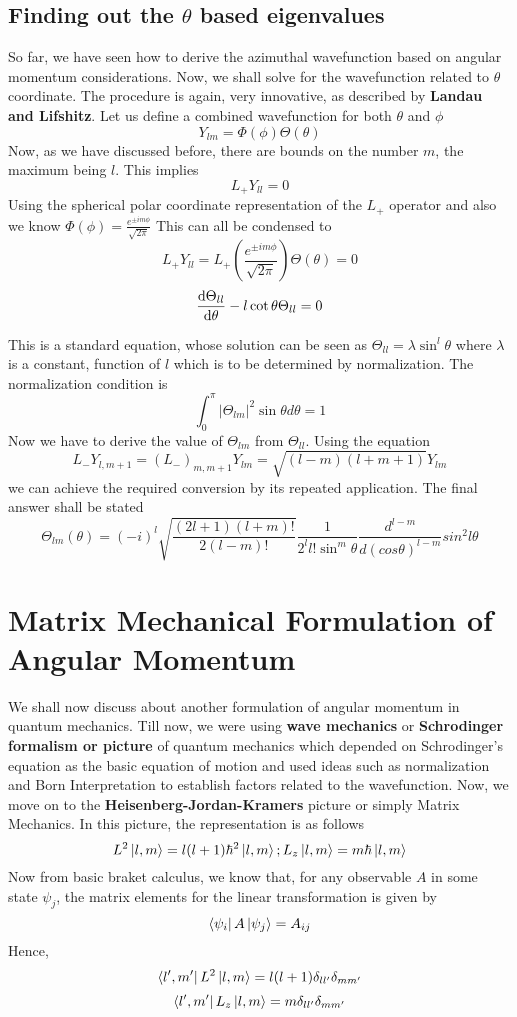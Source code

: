 \documentclass[12pt]{article}
\begin{document}
\subsection{Finding out the $\theta$ based eigenvalues}
So far, we have seen how to derive the azimuthal wavefunction based on angular momentum considerations. Now, we shall solve for the wavefunction related to $\theta$ coordinate. The procedure is again, very innovative, as described by \textbf{Landau and Lifshitz}. Let us define a combined wavefunction for both $\theta$ and $\phi$ $$Y_{lm} = \Phi(\phi)\Theta(\theta)$$ Now, as we have discussed before, there are bounds on the number $m$, the maximum being $l$. This implies $$L_+Y_{ll} = 0$$ Using the spherical polar coordinate representation of the $L_+$ operator and also we know $\Phi(\phi) = \frac{e^{\pm im\phi}}{\sqrt {2\pi}}$ This can all be condensed to 
$$L_+Y_{ll} = L_+(\frac{e^{\pm im\phi}}{\sqrt {2\pi}})\Theta(\theta) = 0$$
$$\frac{\mathrm{d}{\Theta_{ll}}}{\mathrm{d}{\theta}} - l\cot{\theta}\Theta_{ll} = 0$$

This is a standard equation, whose solution can be seen as $\Theta_{ll} = \lambda\sin^l\theta$ where $\lambda$ is a constant, function of $l$ which is to be determined by normalization. The normalization condition is 
$$\int_0^\pi |\Theta_{lm}|^2\sin\theta d\theta = 1$$
Now we have to derive the value of $\Theta_{lm}$ from $\Theta_{ll}$. Using the equation $$L_-Y_{l,m+1} = (L_-)_{m,m+1}Y_{lm} = \sqrt{(l-m)(l+m+1)}Y_{lm}$$ we can achieve the required conversion by its repeated application.
The final answer shall be stated
$$\Theta_{lm}(\theta) = (-i)^l\sqrt{\frac{(2l+1)(l+m)!}{2(l-m)!}}\frac{1}{2^ll!\sin^m\theta}\frac{d^{l-m}}{d(cos\theta)^{l-m}}sin^2l\theta$$

\section{Matrix Mechanical Formulation of Angular Momentum}
We shall now discuss about another formulation of angular momentum in quantum mechanics. Till now, we were using \textbf{wave mechanics} or \textbf{Schrodinger formalism or picture} of quantum mechanics which depended on Schrodinger's equation as the basic equation of motion and used ideas such as normalization and Born Interpretation to establish factors related to the wavefunction. Now, we move on to the \textbf{Heisenberg-Jordan-Kramers} picture or simply Matrix Mechanics. In this picture, the representation is as follows
$$L^2\Ket{l,m} = l(l+1)\hbar^2\Ket{l,m};  L_z\Ket{l,m} = m\hbar\Ket{l,m}$$
Now from basic braket calculus, we know that, for any observable $A$ in some state $\psi_j$, the matrix elements for the linear transformation is given by
$$\Bra{\psi_i}A\Ket{\psi_j} = A_{ij}$$ Hence,
$$\Bra{l',m'}L^2\Ket{l,m} = l(l+1)\delta_{ll'}\delta_{mm'}$$
$$\Bra{l',m'}L_z\Ket{l,m} = m\delta_{ll'}\delta_{mm'}$$
\end{document}
